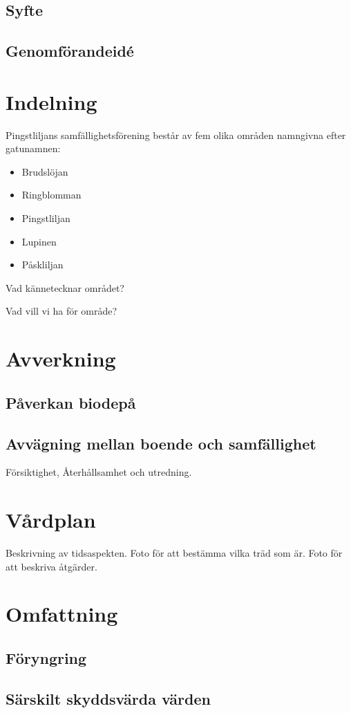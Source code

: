 \documentclass[12pt,a4paper]{article}
\begin{document}
\subsection{Syfte}

\subsection{Genomförandeidé} 







\section{Indelning}
Pingstliljans samfällighetsförening består av fem olika områden namngivna efter gatunamnen: 



\begin{minipage}{0.5\textwidth}
\vspace{2mm}
\begin{itemize}
	\item Brudslöjan
	\item Ringblomman
	\item Pingstliljan
	\item Lupinen
	\item Påskliljan 
\end{itemize}
\end{minipage}%
\begin{minipage}{0.5\textwidth}
Vad kännetecknar området?

Vad vill vi ha för område?

\end{minipage}

\section{Avverkning}
\subsection{Påverkan biodepå}
\subsection{Avvägning mellan boende och samfällighet}
Försiktighet, Återhållsamhet och utredning. 

\section{Vårdplan}
Beskrivning av tidsaspekten.
Foto för att bestämma vilka träd som är. 
Foto för att beskriva åtgärder. 

\section{Omfattning}
\subsection{Föryngring}
\subsection{Särskilt skyddsvärda värden}
\end{document}
